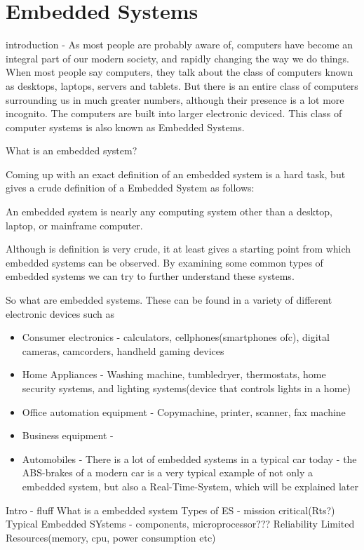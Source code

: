 \section{Embedded Systems}
introduction - As most people are probably aware of, computers have become an integral part of our modern society,
and rapidly changing the way we do things. When most people say computers, they talk about the class of computers
known as desktops, laptops, servers and tablets. But there is an entire class of computers surrounding us in much greater numbers,
although their presence is a lot more incognito. The computers are built into larger electronic deviced.
This class of computer systems is also known as Embedded Systems.

What is an embedded system?

Coming up with an exact definition of an embedded system is a hard task, but \citep{vahid1999embedded} gives a crude
definition of a Embedded System as follows: \nl

An  embedded  system  is  nearly  any computing system other than a desktop, laptop, or  mainframe  computer.

Although is definition is very crude, it at least gives a starting point from which embedded systems can be observed.
By examining some common types of embedded systems we can try to further understand these systems.\nl

So what are embedded systems. These can be found in a variety of different electronic devices such as
\begin{itemize}
\item Consumer electronics - calculators, cellphones(smartphones ofc), digital cameras, camcorders, handheld gaming devices
\item Home Appliances - Washing machine, tumbledryer, thermostats, home security systems, and lighting systems(device that controls lights in a home)
\item Office automation equipment - Copymachine, printer, scanner, fax machine
\item Business equipment -
\item Automobiles - There is a lot of embedded systems in a typical car today - the ABS-brakes of a modern car is a very typical
example of not only a embedded system, but also a Real-Time-System, which will be explained later
\end{itemize}



Intro - fluff
What is a embedded system
Types of ES - mission critical(Rts?)
Typical Embedded SYstems - components, microprocessor???
Reliability
Limited Resources(memory, cpu, power consumption etc)


